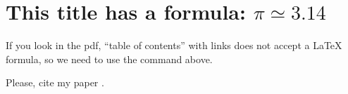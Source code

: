 \chapter{This title has a formula: \texorpdfstring{$\pi \simeq 3.14$}{pi = 3.14}}

If you look in the pdf, ``table of contents'' with links does not accept a \LaTeX{} formula, so we need to use the command above.

Please, cite my paper \cite{paper-Qn}.